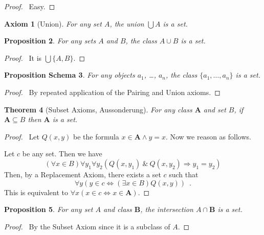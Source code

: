 \documentclass{article}
\let\qed\relax
\newtheorem{axiom}{Axiom}
\newtheorem{proposition}[axiom]{Proposition}
\newtheorem{props}[axiom]{Proposition Schema}
\newtheorem{theorem}[axiom]{Theorem}
\theoremstyle{definition}
\begin{document}
    \begin{proof}
        \pf\ Easy. \qed
    \end{proof}

    \begin{axiom}[Union]
        For any set $A$, the union $\bigcup A$ is a set.
    \end{axiom}

    \begin{proposition}
        For any sets $A$ and $B$, the class $A \cup B$ is a set.
    \end{proposition}

    \begin{proof}
        \pf\ It is $\bigcup \{ A, B \}$. \qed
    \end{proof}

    \begin{props}
        For any objects $a_1$, \ldots, $a_n$, the class $\{ a_1, \ldots, a_n \}$ is a set.
    \end{props}

    \begin{proof}
        \pf\ By repeated application of the Pairing and Union axioms. \qed
    \end{proof}

    \begin{theorem}[Subset Axioms, Aussonderung]
        For any class $\mathbf{A}$ and set $B$, if $\mathbf{A} \subseteq B$ then $\mathbf{A}$ is a set.
    \end{theorem}

    \begin{proof}
        \pf\      Let $Q(x,y)$ be the formula $x \in \mathbf{A} \wedge y = x$. Now we reason as follows.
     
        Let $c$ be any set. Then we have
        \[ (\forall x \in B) \forall y_1 \forall y_2 (Q(x,y_1) \ \&\ Q(x,y_2) \Rightarrow y_1 = y_2) \]
        Then, by a Replacement Axiom, there exists a set $c$ such that
        \[ \forall y (y \in c \Leftrightarrow (\exists x \in B) Q(x,y)) \enspace . \]
        This is equivalent to $\forall x (x \in c \Leftrightarrow x \in \mathbf{A})$. \qed
    \end{proof}

    \begin{proposition}
        For any set $A$ and class $\mathbf{B}$, the intersection $A \cap \mathbf{B}$ is a set.
    \end{proposition}

    \begin{proof}
        \pf\ By the Subset Axiom since it is a subclass of $A$. \qed
    \end{proof}
\end{document}
